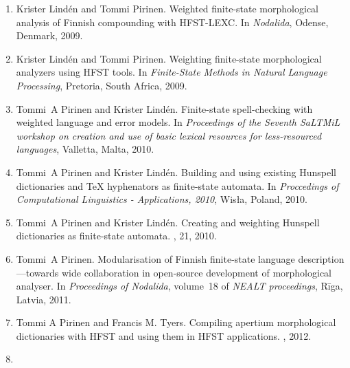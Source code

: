 \documentclass[officiallayout,final]{unihelcompling}
\begin{document}
\begin{enumerate}
    \item[\citetalias{pirinen2009weighted}]
        Krister Lindén and Tommi Pirinen.
        \newblock Weighted finite-state morphological analysis of Finnish 
        compounding with HFST-LEXC.
        \newblock In \emph{Nodalida}, Odense, Denmark, 2009.
    \item[\citetalias{pirinen2009weighting}]
        Krister Lindén and Tommi Pirinen.
        \newblock Weighting finite-state morphological analyzers using HFST
        tools.
        \newblock In \emph{Finite-State Methods in Natural Language Processing},
        Pretoria, South Africa, 2009.
    \item[\citetalias{pirinen2010finitestate}]
        Tommi~A Pirinen and Krister Lindén.
        \newblock Finite-state spell-checking with weighted language and error
        models.
        \newblock In {\em Proceedings of the Seventh SaLTMiL workshop on 
            creation and use of basic lexical resources for less-resourced 
        languages}, Valletta, Malta, 2010.
    \item[\citetalias{pirinen2010building}]
        Tommi~A Pirinen and Krister Lindén.
        \newblock Building and using existing Hunspell dictionaries and {\TeX }
        hyphenators as finite-state automata.
        \newblock In {\em Proccedings of Computational Linguistics -
            Applications, 2010}, Wis{\l}a, Poland, 2010.
    \item[\citetalias{pirinen2010creating}]
        Tommi~A Pirinen and Krister Lindén.
        \newblock Creating and weighting Hunspell dictionaries as finite-state
        automata.
        , 21, 2010.
    \item[\citetalias{pirinen2011modularisation}]
        Tommi~A Pirinen.
        \newblock Modularisation of Finnish finite-state language 
        description—towards wide collaboration in open-source development of
        morphological analyser.
        \newblock In {\em Proceedings of Nodalida}, volume~18 of {\em NEALT
        proceedings}, Rīga, Latvia, 2011.
    \item[\citetalias{pirinen2012compiling}]
        Tommi A Pirinen and Francis M. Tyers.
        \newblock Compiling apertium morphological dictionaries with HFST and
        using them in HFST applications.
        , 2012.
    \item[\citetalias{pirinen2012improving}]

\end{enumerate}
\end{document}
